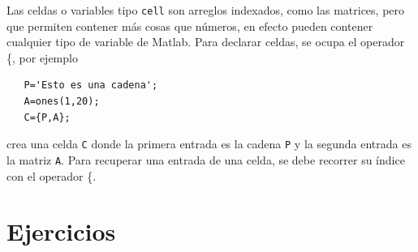\documentclass[letter,11pt]{article}
\newcommand\0{\mathbf{0}}
\begin{document}
  Las celdas o variables tipo \texttt{cell} son arreglos indexados, como las matrices, pero que permiten contener m\'as cosas que n\'umeros, en efecto pueden contener cualquier tipo de variable de Matlab. Para declarar celdas, se ocupa el operador \{, por ejemplo
  \begin{lstlisting}
   P='Esto es una cadena';
   A=ones(1,20);
   C={P,A};
  \end{lstlisting}
  crea una celda \texttt{C} donde la primera entrada es la cadena \texttt{P} y la segunda entrada es la matriz \texttt{A}. 
  Para recuperar una entrada de una celda, se debe recorrer su \'indice con el operador \{.
  

\section{Ejercicios}
\end{document}
